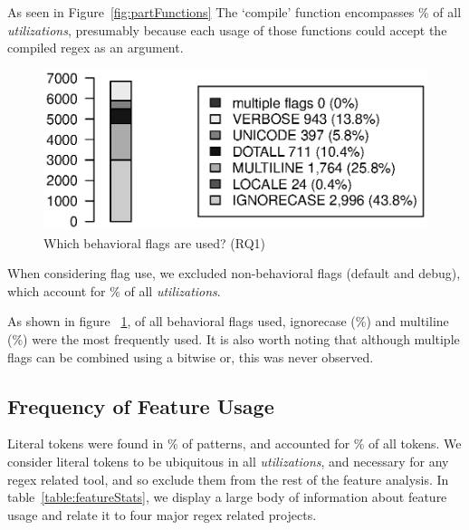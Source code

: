 As seen in Figure~\ref{fig:partFunctions} The `compile' function encompasses \% of all \emph{utilizations}, presumably because each usage of those functions could accept the compiled regex as an argument.

\begin{figure}[tb]
\centering
\includegraphics[width=\columnwidth]{../analysis_output/partFlags.eps}
\caption{Which behavioral flags are used? (RQ1)}
\label{fig:partFlags}
\end{figure}

When considering flag use, we excluded non-behavioral flags (default and debug), which account for \% of all \emph{utilizations}.

 As shown in figure ~\ref{fig:partFlags}, of all behavioral flags used, ignorecase (\%) and multiline (\%) were the most frequently used.  It is also worth noting that although multiple flags can be combined using a bitwise or, this was never observed.

% 

\subsection{Frequency of Feature Usage}

Literal tokens were found in \% of patterns, and accounted for \% of all tokens.  We consider literal tokens to be ubiquitous in all \emph{utilizations}, and necessary for any regex related tool, and so exclude them from the rest of the feature analysis.  In table~\ref{table:featureStats}, we display a large body of information about feature usage and relate it to four major regex related projects.

